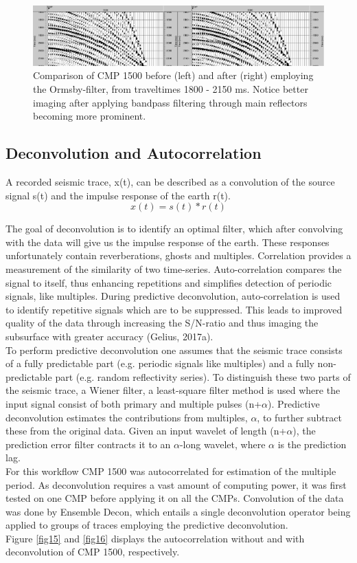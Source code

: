 \documentclass[10pt,a4paper]{article}
\begin{document}
\begin{figure}[H]
\includegraphics[width=\textwidth]{fig14.jpg}
\caption{Comparison of CMP 1500 before (left) and after (right) employing the Ormsby-filter, from traveltimes 1800 - 2150 ms. Notice better imaging after applying bandpass filtering through main reflectors becoming more prominent.}
\label{fig14}
\end{figure}

\subsection{Deconvolution and Autocorrelation}

A recorded seismic trace, x(t), can be described as a convolution of the source signal s(t) and the impulse response of the earth r(t).
$$
x(t) = s(t)*r(t)
$$

\noindent The goal of deconvolution is to identify an optimal filter, which after convolving with the data will give us the impulse response of the earth. These responses unfortunately contain reverberations, ghosts and multiples. Correlation provides a measurement of the similarity of two time-series. Auto-correlation compares the signal to itself, thus enhancing repetitions and simplifies detection of periodic signals, like multiples. During predictive deconvolution, auto-correlation is used to identify repetitive signals which are to be suppressed. This leads to improved quality of the data through increasing the S/N-ratio and thus imaging the subsurface with greater accuracy (Gelius, 2017a). 
\\
To perform predictive deconvolution one assumes that the seismic trace consists of a fully predictable part (e.g. periodic signals like multiples) and a fully non-predictable part (e.g. random reflectivity series). To distinguish these two parts of the seismic trace, a Wiener filter, a least-square filter method is used where the input signal consist of both primary and multiple pulses (n+$\alpha$). Predictive deconvolution estimates the contributions from multiples, $\alpha$, to further subtract these from the original data. Given an input wavelet of length (n+$\alpha$), the prediction error filter contracts it to an $\alpha$-long wavelet, where $\alpha$ is the prediction lag. 
\\
For this workflow CMP 1500 was autocorrelated for estimation of the multiple period. As deconvolution requires a vast amount of computing power, it was first tested on one CMP before applying it on all the CMPs. Convolution of the data was done by Ensemble Decon, which entails a single deconvolution operator being applied to groups of traces employing the predictive deconvolution.
\\
Figure \ref{fig15} and \ref{fig16} displays the autocorrelation without and with deconvolution of CMP 1500, respectively.
\end{document}
